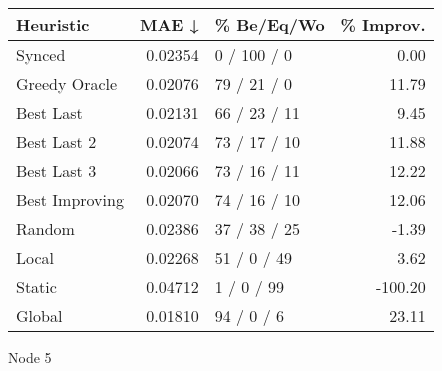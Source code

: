 \begin{tabular}{lrlr}
\toprule
\textbf{Heuristic} & \textbf{MAE ↓} & \textbf{\% Be/Eq/Wo} & \textbf{\% Improv.} \\
\midrule
            Synced &        0.02354 &          0 / 100 / 0 &                0.00 \\
     Greedy Oracle &        0.02076 &          79 / 21 / 0 &               11.79 \\
         Best Last &        0.02131 &         66 / 23 / 11 &                9.45 \\
       Best Last 2 &        0.02074 &         73 / 17 / 10 &               11.88 \\
       Best Last 3 &        0.02066 &         73 / 16 / 11 &               12.22 \\
    Best Improving &        0.02070 &         74 / 16 / 10 &               12.06 \\
            Random &        0.02386 &         37 / 38 / 25 &               -1.39 \\
             Local &        0.02268 &          51 / 0 / 49 &                3.62 \\
            Static &        0.04712 &           1 / 0 / 99 &             -100.20 \\
            Global &        0.01810 &           94 / 0 / 6 &               23.11 \\
\bottomrule
\end{tabular}
\caption{Node 5}
\label{tab:non_lr05_le2_bs4_5}
